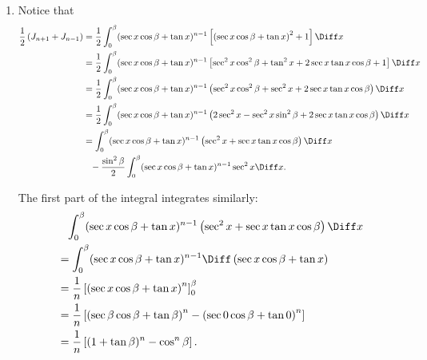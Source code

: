 \begin{enumerate}
    \item Notice that
          \begin{align*}
              \frac{1}{2} \left(J_{n + 1} + J_{n - 1}\right) & = \frac{1}{2} \int_{0}^{\beta} (\sec x \cos \beta + \tan x)^{n - 1} \left[\left(\sec x \cos \beta + \tan x\right)^2 + 1\right] \Diff x                     \\
                                                             & = \frac{1}{2} \int_{0}^{\beta} (\sec x \cos \beta + \tan x)^{n - 1} \left[\sec^2 x \cos^2 \beta + \tan^2 x + 2 \sec x \tan x \cos \beta + 1\right] \Diff x \\
                                                             & = \frac{1}{2} \int_{0}^{\beta} (\sec x \cos \beta + \tan x)^{n - 1} \left(\sec^2 x \cos^2 \beta + \sec^2 x + 2 \sec x \tan x \cos \beta \right) \Diff x    \\
                                                             & = \frac{1}{2} \int_{0}^{\beta} (\sec x \cos \beta + \tan x)^{n - 1} \left(2 \sec^2 x - \sec^2 x \sin^2 \beta + 2 \sec x \tan x \cos \beta \right) \Diff x  \\
                                                             & = \int_{0}^{\beta} (\sec x \cos \beta + \tan x)^{n - 1} \left(\sec^2 x + \sec x \tan x \cos \beta\right) \Diff x                                           \\
                                                             & \phantom{=} - \frac{\sin^2 \beta}{2} \int_{0}^{\beta} (\sec x \cos \beta + \tan x)^{n - 1} \sec^2 x \Diff x.
          \end{align*}

          The first part of the integral integrates similarly:
          \begin{align*}
               & \phantom{=} \int_{0}^{\beta} (\sec x \cos \beta + \tan x)^{n - 1} \left(\sec^2 x + \sec x \tan x \cos \beta\right) \Diff x \\
               & = \int_{0}^{\beta} (\sec x \cos \beta + \tan x)^{n - 1} \Diff \left(\sec x \cos \beta + \tan x\right)                      \\
               & = \frac{1}{n} \left[\left(\sec x \cos \beta + \tan x\right)^{n}\right]_{0}^{\beta}                                         \\
               & = \frac{1}{n} \left[\left(\sec \beta \cos \beta + \tan \beta\right)^n - \left(\sec 0 \cos \beta + \tan 0\right)^n\right]   \\
               & = \frac{1}{n} \left[(1 + \tan \beta)^n - \cos^n \beta\right].
          \end{align*}


\end{enumerate}
